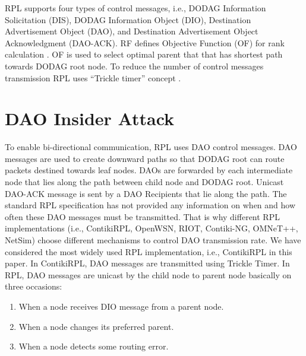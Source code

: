 \documentclass[conference, a4paper]{IEEEtran}
\begin{document}
RPL supports four types of control messages, i.e., DODAG Information Solicitation (DIS), DODAG Information Object (DIO), Destination Advertisement Object (DAO), and Destination Advertisement Object Acknowledgment (DAO-ACK). 
RF defines Objective Function (OF) for rank calculation  \cite{lamaazi2020comprehensive}. OF is used to select optimal parent that that has shortest path towards DODAG root node. 
To reduce the number of control messages transmission RPL uses ``Trickle timer'' concept \cite{levis2011trickle}. 


\section{DAO Insider Attack}\label{Sec:DAO insider attack}
 To enable bi-directional communication, RPL uses DAO control messages. DAO messages are used to create downward paths so that DODAG root can route packets destined towards leaf nodes. DAOs are forwarded by each intermediate node that lies along the path between child node and DODAG root. Unicast DAO-ACK message is sent by a DAO Recipients that lie along the path. The standard RPL specification has not provided any information on when and how often these DAO messages must be transmitted. That is why different RPL implementations (i.e., ContikiRPL, OpenWSN, RIOT, Contiki-NG, OMNeT++, NetSim) choose different mechanisms to control DAO transmission rate. We have considered the most widely used RPL implementation, i.e., ContikiRPL in this paper. In ContikiRPL, DAO messages are transmitted using Trickle Timer. In RPL, DAO messages are unicast by the child node to parent node basically on three occasions:
 
 \begin{enumerate}
     \item When a node receives DIO message from a parent node.
     \item When a node changes its preferred parent.
     \item When a node detects some routing error.
 \end{enumerate}
 
\end{document}
